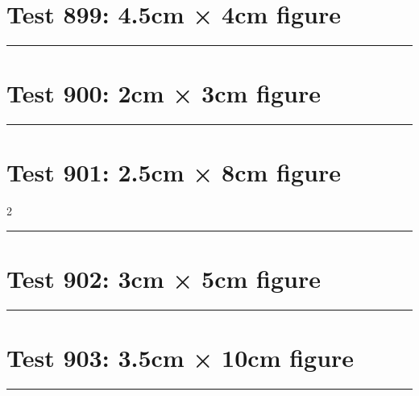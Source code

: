 \documentclass[a4paper,11pt]{article}
\begin{document}
\section*{Test 899: 4.5cm × 4cm figure}
\begin{swarmwrap}%
  \begin{minipage}[t]{4cm}
    \centering
    \rule{\linewidth}{4cm}
  \end{minipage}%
\end{swarmwrap}%
\swarmwrapnext
\lipsum[42]
\lipsum[43]
\lipsum[44]
\lipsum[45]
\lipsum[46]
\lipsum[47]
\section*{Test 900: 2cm × 3cm figure}
\begin{swarmwrap}%
  \begin{minipage}[t]{2cm}
    \centering
    \rule{\linewidth}{3cm}
  \end{minipage}%
\end{swarmwrap}%
\swarmwrapnext
\lipsum[54]
\lipsum[55]
\lipsum[56]
\lipsum[57]
\lipsum[58]
\section*{Test 901: 2.5cm × 8cm figure}
\begin{multicols}{2}
  \begin{swarmwrap}%
    \begin{minipage}[t]{2cm}
      \centering
      \rule{\linewidth}{8cm}
    \end{minipage}%
  \end{swarmwrap}%
  \swarmwrapnext
  \lipsum[74]
  \lipsum[75]
  \lipsum[76]
  \lipsum[77]
  \lipsum[78]
\end{multicols}
\section*{Test 902: 3cm × 5cm figure}
\begin{swarmwrap}%
  \begin{minipage}[t]{3cm}
    \centering
    \rule{\linewidth}{5cm}
  \end{minipage}%
\end{swarmwrap}%
\swarmwrapnext
\lipsum[14]
\lipsum[15]
\lipsum[16]
\section*{Test 903: 3.5cm × 10cm figure}
\begin{swarmwrap}%
  \begin{minipage}[t]{3cm}
    \centering
    \rule{\linewidth}{10cm}
  \end{minipage}%
\end{swarmwrap}%
\swarmwrapnext
\lipsum[41]
\lipsum[42]
\lipsum[43]
\lipsum[44]
\lipsum[45]
\lipsum[46]
\end{document}
